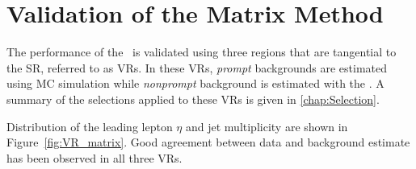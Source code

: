 \begin{table}[th]
\sffamily
\centering
\caption{Summary of the selection criteria applied to the measurement regions of $r$ and $f$. ``OffZ'' means events containing two \ac{SS} electrons with an in variant mass between 76 and 106 GeV are removed. $C_i$ denotes the electric charge of the selected lepton.}
\label{tab:MR}
\end{table}

\section{Validation of the Matrix Method}
\label{sec:MMVR}

The performance of the \mm~is validated using three regions that are tangential to the \ac{SR}, referred to as \acp{VR}. In these \acp{VR}, \emph{prompt} backgrounds are estimated using \ac{MC} simulation while \emph{nonprompt} background is estimated with the \mm. A summary of the selections applied to these VRs is given in \autoref{chap:Selection}. 

Distribution of the leading lepton $\eta$ and jet multiplicity are shown in Figure~\ref{fig:VR_matrix}. Good agreement between data and background estimate has been observed in all three \acp{VR}.

